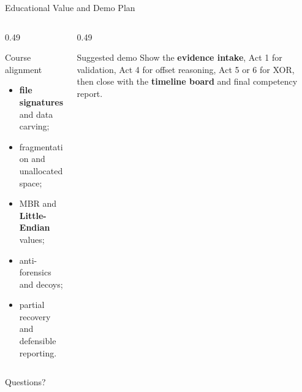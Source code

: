 \documentclass[aspectratio=169]{beamer}
\begin{document}
\begin{frame}{Educational Value and Demo Plan}
  \begin{columns}[T,onlytextwidth]
    \begin{column}{0.49\textwidth}
      \begin{block}{Course alignment}
        \begin{itemize}
          \item \textbf{file signatures} and data carving;
          \item fragmentation and unallocated space;
          \item MBR and \textbf{Little-Endian} values;
          \item anti-forensics and decoys;
          \item partial recovery and defensible reporting.
        \end{itemize}
      \end{block}
    \end{column}
    \begin{column}{0.49\textwidth}
      \begin{block}{Suggested demo}
        Show the \textbf{evidence intake}, Act 1 for validation, Act 4 for offset
        reasoning, Act 5 or 6 for XOR, then close with the \textbf{timeline board}
        and final competency report.
      \end{block}
    \end{column}
  \end{columns}

  \vfill
  \centering
  \Large Questions?
\end{frame}
\end{document}
